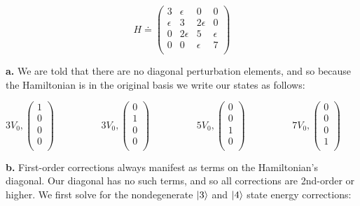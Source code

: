 \documentclass[10pt]{article} %
\begin{document}
\begin{equation*}
  H \doteq
  \begin{pmatrix}
    3 & \epsilon & 0 & 0\\
    \epsilon & 3 & 2\epsilon & 0\\
    0 & 2\epsilon & 5 & \epsilon\\
    0 & 0 & \epsilon & 7\\
  \end{pmatrix}
\end{equation*}

\textbf{a.}
We are told that there are no diagonal perturbation elements, and so because the Hamiltonian is in
the original basis we write our states as follows:

\begin{equation*}
  3V_0,
  \begin{pmatrix}
    1 \\ 0 \\ 0 \\ 0\\
  \end{pmatrix}
  \hspace{2cm}
  3V_0,
  \begin{pmatrix}
    0 \\ 1 \\ 0 \\ 0\\
  \end{pmatrix}
  \hspace{2cm}
  5V_0,
  \begin{pmatrix}
    0 \\ 0 \\ 1 \\ 0\\
  \end{pmatrix}
  \hspace{2cm}
  7V_0,
  \begin{pmatrix}
    0 \\ 0 \\ 0 \\ 1\\
  \end{pmatrix}
  \hspace{2cm}
\end{equation*}

\textbf{b.}
First-order corrections always manifest as terms on the Hamiltonian's diagonal. Our diagonal has
no such terms, and so all corrections are 2nd-order or higher. We first solve for the nondegenerate
$\ket{3}$ and $\ket{4}$ state energy corrections:
\end{document}
